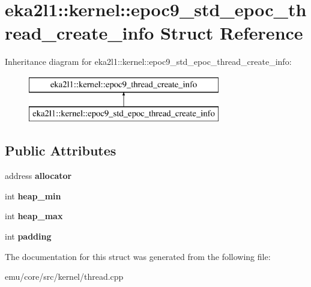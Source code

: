 \hypertarget{structeka2l1_1_1kernel_1_1epoc9__std__epoc__thread__create__info}{}\section{eka2l1\+:\+:kernel\+:\+:epoc9\+\_\+std\+\_\+epoc\+\_\+thread\+\_\+create\+\_\+info Struct Reference}
\label{structeka2l1_1_1kernel_1_1epoc9__std__epoc__thread__create__info}
Inheritance diagram for eka2l1\+:\+:kernel\+:\+:epoc9\+\_\+std\+\_\+epoc\+\_\+thread\+\_\+create\+\_\+info\+:\begin{figure}[H]
\begin{center}
\leavevmode
\includegraphics[height=2.000000cm]{structeka2l1_1_1kernel_1_1epoc9__std__epoc__thread__create__info}
\end{center}
\end{figure}
\subsection*{Public Attributes}
\begin{DoxyCompactItemize}
\item 
\mbox{\label{structeka2l1_1_1kernel_1_1epoc9__std__epoc__thread__create__info_acf5af60fea7f14e198b8423baa5e8218}} 
address {\bfseries allocator}
\item 
\mbox{\label{structeka2l1_1_1kernel_1_1epoc9__std__epoc__thread__create__info_a05fb1fce557d6d597f1653241070c46a}} 
int {\bfseries heap\+\_\+min}
\item 
\mbox{\label{structeka2l1_1_1kernel_1_1epoc9__std__epoc__thread__create__info_acd13cd894e334f49906837d26417a5f8}} 
int {\bfseries heap\+\_\+max}
\item 
\mbox{\label{structeka2l1_1_1kernel_1_1epoc9__std__epoc__thread__create__info_a12adca368725c41c3dd71163bdb5e130}} 
int {\bfseries padding}
\end{DoxyCompactItemize}


The documentation for this struct was generated from the following file\+:\begin{DoxyCompactItemize}
\item 
emu/core/src/kernel/thread.\+cpp\end{DoxyCompactItemize}
